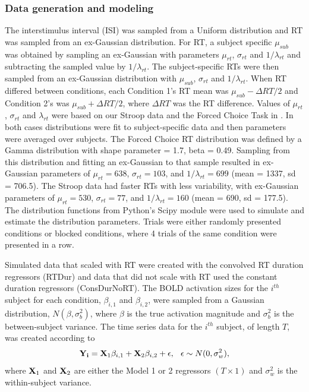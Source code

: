 \documentclass[titlepage,12pt] {article}
\begin{document}
\subsubsection*{Data generation and modeling} 


The interstimulus interval (ISI) was sampled from a Uniform distribution and RT was sampled from an ex-Gaussian distribution.  For RT, a subject specific $\mu_{sub}$ was obtained by sampling an ex-Gaussian with parameters $\mu_{rt}$, $\sigma_{rt}$ and $1/\lambda_{rt}$ and subtracting the sampled value by $1/\lambda_{rt}$.  The subject-specific RTs were then sampled from an ex-Gaussian distribution with $\mu_{sub}$, $\sigma_{rt}$ and $1/\lambda_{rt}$.  
When RT differed between conditions, each Condition 1's RT mean was $\mu_{sub} - \Delta RT/2$ and Condition 2's was $\mu_{sub}+\Delta RT/2$, where $\Delta RT$ was the RT difference.  Values of $\mu_{rt}$, $\sigma_{rt}$ and $\lambda_{rt}$ were based on our Stroop data and the Forced Choice Task in \citet{grinband_detection_2008}.  In both cases distributions were fit to subject-specific data and then parameters were averaged over subjects.  The Forced Choice RT distribution was defined by a Gamma distribution with shape parameter = 1.7, beta = 0.49.  Sampling from this distribution and fitting an ex-Gaussian to that sample resulted in ex-Gaussian parameters of $\mu_{rt} = 638$, $\sigma_{rt} = 103$, and $1/\lambda_{rt} = 699$ (mean = 1337, sd = 706.5). The Stroop data had faster RTs with less variability, with ex-Gaussian parameters of  $\mu_{rt} =530$, $\sigma_{rt} = 77$, and $1/\lambda_{rt} = 160$ (mean = 690, sd = 177.5).  The distribution functions from Python's Scipy module were used to simulate and estimate the distribution parameters. Trials were either randomly presented conditions or blocked conditions, where 4 trials of the same condition were presented in a row.
 


Simulated data that scaled with RT were created with the convolved RT duration regressors (RTDur) and data that did not scale with RT used the constant duration regressors (ConsDurNoRT).  The BOLD activation sizes for the $i^{th}$ subject for each condition, $\beta_{i, 1}$ and $\beta_{i,2}$, were  sampled from a Gaussian distribution, $N(\beta, \sigma_b^2)$,  where $\beta$ is the true activation magnitude and $\sigma^2_b$ is the between-subject variance.  The time series data for the $i^{th}$ subject, of length $T$, was created according to 
\begin{equation} \label{eq:timeseries}
   \vb{Y_i} = \vb{X}_{1}\beta_{i, 1}  +  \vb{X}_{2}\beta_{i, 2} + \epsilon, \hspace{.1in} \epsilon \sim N(0, \sigma^2_w), 
\end{equation}
where $\vb{X}_{1}$ and $\vb{X}_{2}$  are either the Model 1 or 2 regressors $(T\times 1)$  and $\sigma^2_w$ is the within-subject variance.  
\end{document}
